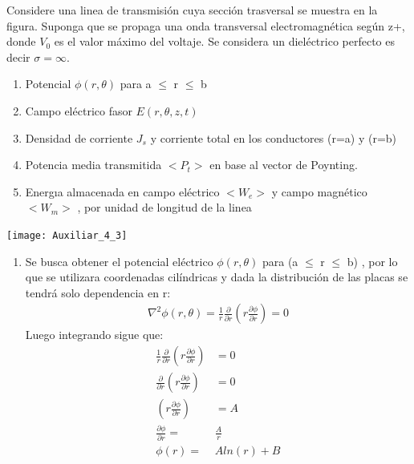 \documentclass[
  11pt,
  letterpaper,
   addpoints,
   answers
  ]{exam}
\begin{document}
\begin{questions}
    \question  Considere una linea de transmisión cuya sección trasversal se muestra en la figura. Suponga que se propaga una onda transversal electromagnética según z+, donde $V_{0}$ es el valor máximo del voltaje. Se considera un dieléctrico perfecto es decir $\sigma = \infty$.
    \begin{enumerate}
        \item Potencial $\phi(r, \theta)$ para a $\leq$ r $\leq$ b
        \item Campo eléctrico fasor $E(r, \theta, z, t)$
        \item Densidad de corriente $J_{s}$ y corriente total en los conductores (r=a) y (r=b)
        \item Potencia media transmitida $< P_{t} >$ en base al vector de Poynting.
        \item  Energıa almacenada en campo eléctrico $< W_{e} >$ y campo magnético $< W_{m} >$ , por unidad de longitud de la linea
    \end{enumerate}
    \begin{center}
        \texttt{[image: Auxiliar\_4\_3]}
      \end{center}
    \begin{solution}
        \begin{enumerate}
            \item Se busca obtener el potencial eléctrico $\phi(r,\theta)$ para (a $\leq$ r $\leq$ b) , por lo que se utilizara  coordenadas cilíndricas y dada la distribución de las placas se tendrá solo dependencia en r:
            \begin{align}
                \nabla^{2}\phi(r,\theta) =\frac{1}{r} \frac{\partial}{\partial r}\left(r \frac{\partial \phi}{\partial r}\right)= 0
            \end{align}
            Luego integrando sigue que:
            \begin{align}
                \frac{1}{r} \frac{\partial}{\partial r}\left(r \frac{\partial \phi}{\partial r}\right)&= 0\\
                 \frac{\partial}{\partial r}\left(r \frac{\partial \phi}{\partial r}\right)&= 0\\
                 \left(r \frac{\partial \phi}{\partial r}\right)&= A\\
                 \frac{\partial \phi}{ \partial r} =& \frac{A}{r}\\
                 \phi(r) =& Aln(r) + B

\end{align}
\end{enumerate}
\end{solution}
\end{questions}
\end{document}
